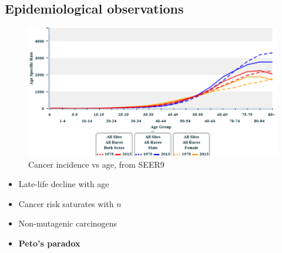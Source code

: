 \documentclass[a0,landscape]{a0poster}
\begin{document}
\begin{multicols}{3}
		\section{Epidemiological observations}
		\begin{minipage}{.5\linewidth}
		\flushleft
			\begin{figure}[H]
				\includegraphics[width=\linewidth]{fig1.png}
				\caption{Cancer incidence vs age, from SEER9 \cite{AmericanCancerSociety2016}}
			\end{figure}
		\end{minipage}
		\hspace{0.05\linewidth}
		\begin{minipage}{.5\linewidth}
		\flushright
				\begin{itemize}
					\item Late-life decline with age
					\item Cancer risk saturates with $n$
					\item Non-mutagenic carcinogens
					\item \textbf{Peto's paradox}
				\end{itemize}
		\end{minipage}
		

\end{multicols}
\end{document}

